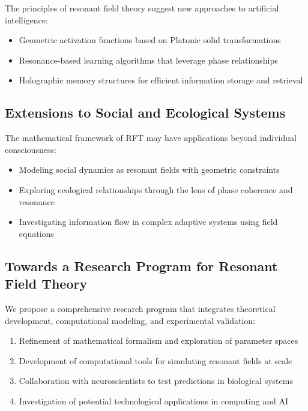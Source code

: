 \documentclass[12pt,letterpaper]{article}
\begin{document}
The principles of resonant field theory suggest new approaches to artificial intelligence:

\begin{itemize}
    \item Geometric activation functions based on Platonic solid transformations
    \item Resonance-based learning algorithms that leverage phase relationships
    \item Holographic memory structures for efficient information storage and retrieval
\end{itemize}

\vspace{2mm}
\subsection{Extensions to Social and Ecological Systems}
\label{subsec:social_ecological}

The mathematical framework of RFT may have applications beyond individual consciousness:

\begin{itemize}
    \item Modeling social dynamics as resonant fields with geometric constraints
    \item Exploring ecological relationships through the lens of phase coherence and resonance
    \item Investigating information flow in complex adaptive systems using field equations
\end{itemize}

\vspace{2mm}
\subsection{Towards a Research Program for Resonant Field Theory}
\label{subsec:research_program}

We propose a comprehensive research program that integrates theoretical development, computational modeling, and experimental validation:

\begin{enumerate}
    \item Refinement of mathematical formalism and exploration of parameter spaces
    \item Development of computational tools for simulating resonant fields at scale
    \item Collaboration with neuroscientists to test predictions in biological systems
    \item Investigation of potential technological applications in computing and AI
\end{enumerate}
\end{document}
